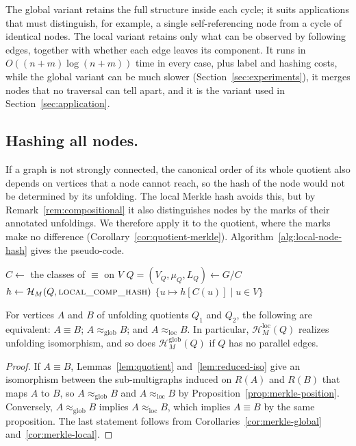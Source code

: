 \documentclass[twoside,leqno]{article}
\newcommand{\HL}{\mathcal{H}_{L}}
\newcommand{\HM}{\mathcal{H}_{M}}
\newcommand{\HMg}{\mathcal{H}_{M}^{\mathrm{glob}}}
\newcommand{\HMl}{\mathcal{H}_{M}^{\mathrm{loc}}}
\newcommand{\eqg}{\approx_{\mathrm{glob}}}
\newcommand{\eql}{\approx_{\mathrm{loc}}}
\newcommand{\Reach}{R}
\begin{document}
The global variant retains the full structure inside each cycle; it suits applications that must distinguish, for example, a single self-referencing node from a cycle of identical nodes. The local variant retains only what can be observed by following edges, together with whether each edge leaves its component. It runs in $O((n+m)\log(n+m))$ time in every case, plus label and hashing costs, while the global variant can be much slower (Section~\ref{sec:experiments}), it merges nodes that no traversal can tell apart, and it is the variant used in Section~\ref{sec:application}.

\subsection{Hashing all nodes.}
\label{sec:all-nodes}
If a graph is not strongly connected, the canonical order of its whole quotient also depends on vertices that a node cannot reach, so the hash of the node would not be determined by its unfolding. The local Merkle hash avoids this, but by Remark~\ref{rem:compositional} it also distinguishes nodes by the marks of their annotated unfoldings. We therefore apply it to the quotient, where the marks make no difference (Corollary~\ref{cor:quotient-merkle}). Algorithm~\ref{alg:local-node-hash} gives the pseudo-code.

\begin{algorithm}[t]
    \caption{Local Digraph Node Hash}\label{alg:local-node-hash}
    \begin{algorithmic}[1]
    \Function{$\HL$}{$G=(V,\mu,L)$}
        \State $C \gets$ the classes of $\equiv$ on $V$ 
        \State $Q=(V_Q,\mu_Q,L_Q) \gets G / C$ 
        \State $h \gets \HM(Q, \textproc{local\_comp\_hash})$ \Comment{Algorithm~\ref{alg:merklegraphhash}, i.e.\ $h=\HMl(Q)$}
        \State \Return $\{u \mapsto h[C(u)] \mid u \in V\}$
    \EndFunction
    \end{algorithmic}
\end{algorithm}

\begin{cor}
\label{cor:quotient-merkle}
For vertices $A$ and $B$ of unfolding quotients $Q_1$ and $Q_2$, the following are equivalent: $A\equiv B$; $A\eqg B$; and $A\eql B$. In particular, $\HMl(Q)$ realizes unfolding isomorphism, and so does $\HMg(Q)$ if $Q$ has no parallel edges.
\end{cor}
\begin{proof}
If $A\equiv B$, Lemmas~\ref{lem:quotient} and~\ref{lem:reduced-iso} give an isomorphism between the sub-multigraphs induced on $\Reach(A)$ and $\Reach(B)$ that maps $A$ to $B$, so $A\eqg B$ and $A\eql B$ by Proposition~\ref{prop:merkle-position}. Conversely, $A\eqg B$ implies $A\eql B$, which implies $A\equiv B$ by the same proposition. The last statement follows from Corollaries~\ref{cor:merkle-global} and~\ref{cor:merkle-local}.
\end{proof}
\end{document}
